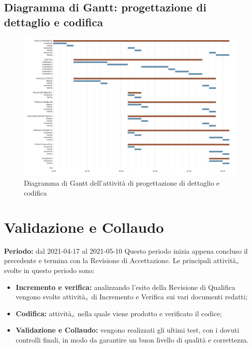 \subsection{Diagramma di Gantt: progettazione di dettaglio e codifica}\label{PianificazioneDiagrammaDiGanttProgettazioneDettaglio}
\begin{figure}[!h]
	\begin{center}
		\includegraphics[width=1\linewidth]{../immagini/pdp/gantt_progettazione_dettaglio3.png}
		\caption{Diagramma di Gantt dell'attività di progettazione di dettaglio e codifica}
	\end{center}
\end{figure}
\clearpage
\section{Validazione e Collaudo}\label{PianificazioneValidazione}
\textbf{Periodo:} dal 2021-04-17 al 2021-05-10
Questo periodo inizia appena concluso il precedente e termina con la Revisione di Accettazione.
Le principali attività$_{\scaleto{G}{3pt}}$ svolte in questo periodo sono:
\begin{itemize}
	\item \textbf{Incremento e verifica:} analizzando l'esito della Revisione di Qualifica vengono svolte attività$_{\scaleto{G}{3pt}}$ di Incremento e Verifica sui vari documenti redatti;
	\item \textbf{Codifica:} attività$_{\scaleto{G}{3pt}}$ nella quale viene prodotto e verificato il codice;
	\item \textbf{Validazione e Collaudo:} vengono realizzati gli ultimi test, con i dovuti controlli finali, in modo da garantire un buon livello di qualità e correttezza.
\end{itemize}
